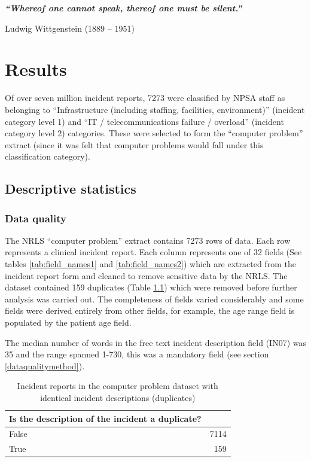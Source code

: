 \textbf{\textit{``Whereof one cannot speak, thereof one must be silent.''}}

Ludwig Wittgenstein (1889 – 1951)

\chapter{Results}
Of over seven million incident reports, 7273 were classified by NPSA staff as belonging to ``Infrastructure (including staffing, facilities, environment)'' (incident category level 1) and ``IT / telecommunications failure / overload'' (incident category level 2) categories. These were selected to form the ``computer problem'' extract (since it was felt that computer problems would fall under this classification category).

\section{Descriptive statistics}

\subsection{Data quality}
\label{dataqualityresults}

The NRLS ``computer problem'' extract contains 7273 rows of data. Each row represents a clinical incident report. Each column represents one of 32 fields (See tables \ref{tab:field_names1} and \ref{tab:field_names2}) which are extracted from the incident report form and cleaned to remove sensitive data by the NRLS. The dataset contained 159 duplicates (Table \ref{tab:duplicates}) which were removed before further analysis was carried out. The completeness of fields varied considerably and some fields were derived entirely from other fields, for example, the age range field is populated by the patient age field. 

The median number of words in the free text incident description field (IN07) was 35 and the range spanned 1-730, this was a mandatory field (see section \ref{dataqualitymethod}).


\begin{table}[htbp]\centering
\begin{tabular}{lr}
\toprule
\textbf{Is the description of the incident a duplicate?} & {} \\
\midrule
False &	7114 \\
True  &	159 \\
\bottomrule
\end{tabular}
\caption{Incident reports in the computer problem dataset with identical incident descriptions (duplicates)}
\label{tab:duplicates}
\end{table}


